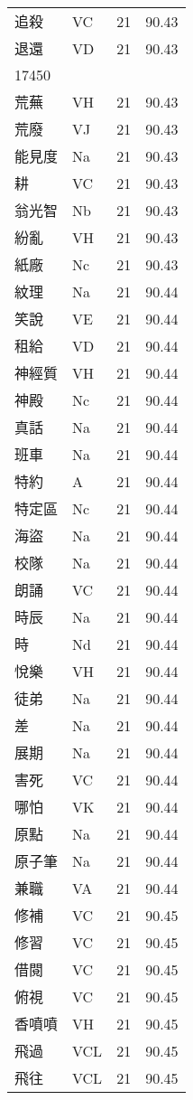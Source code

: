 \documentclass[twocolumn]{book}
\begin{document}
\begin{supertabular}{llrr}
追殺 & VC & 21 &  90.43\\
退還 & VD & 21 &  90.43\\
17450\\
荒蕪 & VH & 21 &  90.43\\
荒廢 & VJ & 21 &  90.43\\
能見度 & Na & 21 &  90.43\\
耕 & VC & 21 &  90.43\\
翁光智 & Nb & 21 &  90.43\\
紛亂 & VH & 21 &  90.43\\
紙廠 & Nc & 21 &  90.43\\
紋理 & Na & 21 &  90.44\\
笑說 & VE & 21 &  90.44\\
租給 & VD & 21 &  90.44\\
神經質 & VH & 21 &  90.44\\
神殿 & Nc & 21 &  90.44\\
真話 & Na & 21 &  90.44\\
班車 & Na & 21 &  90.44\\
特約 & A & 21 &  90.44\\
特定區 & Nc & 21 &  90.44\\
海盜 & Na & 21 &  90.44\\
校隊 & Na & 21 &  90.44\\
朗誦 & VC & 21 &  90.44\\
時辰 & Na & 21 &  90.44\\
時 & Nd & 21 &  90.44\\
悅樂 & VH & 21 &  90.44\\
徒弟 & Na & 21 &  90.44\\
差 & Na & 21 &  90.44\\
展期 & Na & 21 &  90.44\\
害死 & VC & 21 &  90.44\\
哪怕 & VK & 21 &  90.44\\
原點 & Na & 21 &  90.44\\
原子筆 & Na & 21 &  90.44\\
兼職 & VA & 21 &  90.44\\
修補 & VC & 21 &  90.45\\
修習 & VC & 21 &  90.45\\
借閱 & VC & 21 &  90.45\\
俯視 & VC & 21 &  90.45\\
香噴噴 & VH & 21 &  90.45\\
飛過 & VCL & 21 &  90.45\\
飛往 & VCL & 21 &  90.45\\

\end{supertabular}
\end{document}
